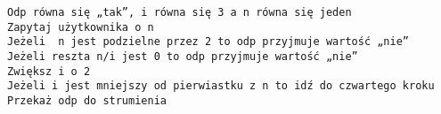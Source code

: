 \begin{verbatim}
Odp równa się „tak”, i równa się 3 a n równa się jeden
Zapytaj użytkownika o n
Jeżeli  n jest podzielne przez 2 to odp przyjmuje wartość „nie”
Jeżeli reszta n/i jest 0 to odp przyjmuje wartość „nie”
Zwiększ i o 2
Jeżeli i jest mniejszy od pierwiastku z n to idź do czwartego kroku 
Przekaż odp do strumienia 
\end{verbatim}